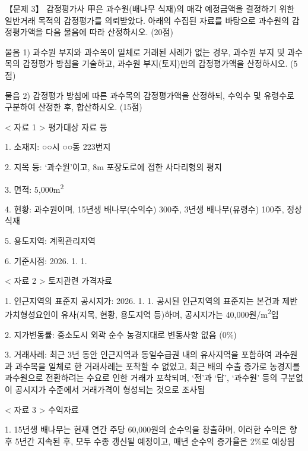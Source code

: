 \begin{longquestion}{【문제 3】}
감정평가사 甲은 과수원(배나무 식재)의 매각 예정금액을 결정하기 위한 일반거래 목적의 감정평가를 의뢰받았다. 아래의 수집된 자료를 바탕으로 과수원의 감정평가액을 다음 물음에 따라 산정하시오. (20점) \par
\medskip\noindent 물음 1) 과수원 부지와 과수목이 일체로 거래된 사례가 없는 경우, 과수원 부지 및 과수목의 감정평가 방침을 기술하고, 과수원 부지(토지)만의 감정평가액을 산정하시오. (5점) \par
\medskip\noindent 물음 2) 감정평가 방침에 따른 과수목의 감정평가액을 산정하되, 수익수 및 유령수로 구분하여 산정한 후, 합산하시오. (15점) \par
< 자료 1 > 평가대상 자료 등 \par
1. 소재지: ○○시 ○○동 223번지 \par
2. 지목 등: ‘과수원’이고, 8m 포장도로에 접한 사다리형의 평지 \par
3. 면적: 5,000m\textsuperscript{2} \par
4. 현황: 과수원이며, 15년생 배나무(수익수) 300주, 3년생 배나무(유령수) 100주, 정상식재 \par
5. 용도지역: 계획관리지역 \par
6. 기준시점: 2026. 1. 1. \par
< 자료 2 > 토지관련 가격자료 \par
1. 인근지역의 표준지 공시지가: 2026. 1. 1. 공시된 인근지역의 표준지는 본건과 제반 가치형성요인이 유사(지목, 현황, 용도지역 등)하며, 공시지가는 40,000원/m\textsuperscript{2}임 \par
2. 지가변동률: 중소도시 외곽 순수 농경지대로 변동사항 없음 (0\%) \par
3. 거래사례: 최근 3년 동안 인근지역과 동일수급권 내의 유사지역을 포함하여 과수원과 과수목을 일체로 한 거래사례는 포착할 수 없었고, 최근 배의 수출 증가로 농경지를 과수원으로 전환하려는 수요로 인한 거래가 포착되며, ‘전’과 ‘답’, ‘과수원’ 등의 구분없이 공시지가 수준에서 거래가격이 형성되는 것으로 조사됨 \par
< 자료 3 > 수익자료 \par
1. 15년생 배나무는 현재 연간 주당 60,000원의 순수익을 창출하며, 이러한 수익은 향후 5년간 지속된 후, 모두 수종 갱신될 예정이고, 매년 순수익 증가율은 2\%로 예상됨 \par

\end{longquestion}
